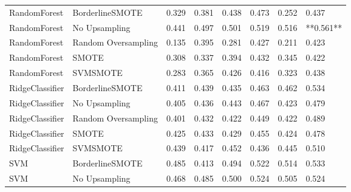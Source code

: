 \begin{tabular}{llllllll}
                RandomForest &     BorderlineSMOTE & 0.329 &                     0.381 &                 0.438 &                  0.473 &                                   0.252 &     0.437 \\
                RandomForest &       No Upsampling & 0.441 &                     0.497 &                 0.501 &                  0.519 &                                   0.516 & **0.561** \\
                RandomForest & Random Oversampling & 0.135 &                     0.395 &                 0.281 &                  0.427 &                                   0.211 &     0.423 \\
                RandomForest &               SMOTE & 0.308 &                     0.337 &                 0.394 &                  0.432 &                                   0.345 &     0.422 \\
                RandomForest &            SVMSMOTE & 0.283 &                     0.365 &                 0.426 &                  0.416 &                                   0.323 &     0.438 \\
             RidgeClassifier &     BorderlineSMOTE & 0.411 &                     0.439 &                 0.435 &                  0.463 &                                   0.462 &     0.534 \\
             RidgeClassifier &       No Upsampling & 0.405 &                     0.436 &                 0.443 &                  0.467 &                                   0.423 &     0.479 \\
             RidgeClassifier & Random Oversampling & 0.401 &                     0.432 &                 0.422 &                  0.449 &                                   0.422 &     0.489 \\
             RidgeClassifier &               SMOTE & 0.425 &                     0.433 &                 0.429 &                  0.455 &                                   0.424 &     0.478 \\
             RidgeClassifier &            SVMSMOTE & 0.439 &                     0.417 &                 0.452 &                  0.436 &                                   0.445 &     0.510 \\
                         SVM &     BorderlineSMOTE & 0.485 &                     0.413 &                 0.494 &                  0.522 &                                   0.514 &     0.533 \\
                         SVM &       No Upsampling & 0.468 &                     0.485 &                 0.500 &                  0.524 &                                   0.505 &     0.524 \\

\end{tabular}
